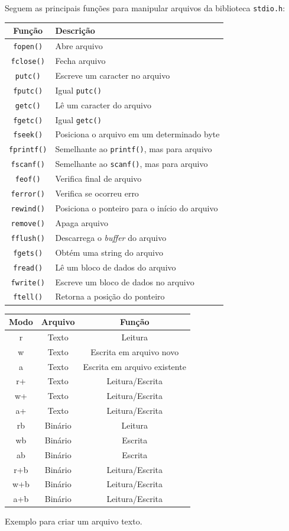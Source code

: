 \documentclass[12pt,a4paper]{article}
\begin{document}
Seguem as principais funções para manipular arquivos da biblioteca
\texttt{stdio.h}:

\begin{longtable}[]{@{}cl@{}}
\toprule
Função & Descrição\tabularnewline
\midrule
\endhead
\texttt{fopen()} & Abre arquivo\tabularnewline
\texttt{fclose()} & Fecha arquivo\tabularnewline
\texttt{putc()} & Escreve um caracter no arquivo\tabularnewline
\texttt{fputc()} & Igual \texttt{putc()}\tabularnewline
\texttt{getc()} & Lê um caracter do arquivo\tabularnewline
\texttt{fgetc()} & Igual \texttt{getc()}\tabularnewline
\texttt{fseek()} & Posiciona o arquivo em um determinado
byte\tabularnewline
\texttt{fprintf()} & Semelhante ao \texttt{printf()}, mas para
arquivo\tabularnewline
\texttt{fscanf()} & Semelhante ao \texttt{scanf()}, mas para
arquivo\tabularnewline
\texttt{feof()} & Verifica final de arquivo\tabularnewline
\texttt{ferror()} & Verifica se ocorreu erro\tabularnewline
\texttt{rewind()} & Posiciona o ponteiro para o início do
arquivo\tabularnewline
\texttt{remove()} & Apaga arquivo\tabularnewline
\texttt{fflush()} & Descarrega o \emph{buffer} do arquivo\tabularnewline
\texttt{fgets()} & Obtém uma string do arquivo\tabularnewline
\texttt{fread()} & Lê um bloco de dados do arquivo\tabularnewline
\texttt{fwrite()} & Escreve um bloco de dados no arquivo\tabularnewline
\texttt{ftell()} & Retorna a posição do ponteiro\tabularnewline
\bottomrule
\end{longtable}

    \begin{longtable}[]{@{}ccc@{}}
\toprule
\textbf{Modo} & \textbf{Arquivo} & \textbf{Função}\tabularnewline
\midrule
\endhead
r & Texto & Leitura\tabularnewline
w & Texto & Escrita em arquivo novo\tabularnewline
a & Texto & Escrita em arquivo existente\tabularnewline
r+ & Texto & Leitura/Escrita\tabularnewline
w+ & Texto & Leitura/Escrita\tabularnewline
a+ & Texto & Leitura/Escrita\tabularnewline
rb & Binário & Leitura\tabularnewline
wb & Binário & Escrita\tabularnewline
ab & Binário & Escrita\tabularnewline
r+b & Binário & Leitura/Escrita\tabularnewline
w+b & Binário & Leitura/Escrita\tabularnewline
a+b & Binário & Leitura/Escrita\tabularnewline
\bottomrule
\end{longtable}

    Exemplo para criar um arquivo texto.
\end{document}
